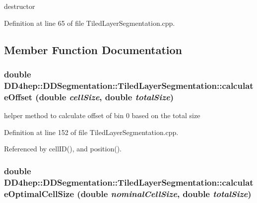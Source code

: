 destructor 

Definition at line 65 of file TiledLayerSegmentation.cpp.

\subsection{Member Function Documentation}
\hypertarget{class_d_d4hep_1_1_d_d_segmentation_1_1_tiled_layer_segmentation_a7c5f4fe56bec27c51187a8413fe96d38}{
\subsubsection[{calculateOffset}]{\setlength{\rightskip}{0pt plus 5cm}double DD4hep::DDSegmentation::TiledLayerSegmentation::calculateOffset (double {\em cellSize}, \/  double {\em totalSize})}}
\label{class_d_d4hep_1_1_d_d_segmentation_1_1_tiled_layer_segmentation_a7c5f4fe56bec27c51187a8413fe96d38}


helper method to calculate offset of bin 0 based on the total size 

Definition at line 152 of file TiledLayerSegmentation.cpp.

Referenced by cellID(), and position().\hypertarget{class_d_d4hep_1_1_d_d_segmentation_1_1_tiled_layer_segmentation_a3cbdc472b5f800c0a1fc99080f1fd72d}{
\subsubsection[{calculateOptimalCellSize}]{\setlength{\rightskip}{0pt plus 5cm}double DD4hep::DDSegmentation::TiledLayerSegmentation::calculateOptimalCellSize (double {\em nominalCellSize}, \/  double {\em totalSize})}}
\label{class_d_d4hep_1_1_d_d_segmentation_1_1_tiled_layer_segmentation_a3cbdc472b5f800c0a1fc99080f1fd72d}


